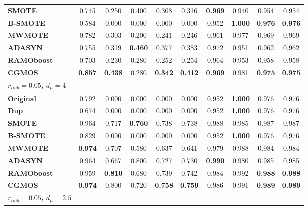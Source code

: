 \documentclass{iitthesis}
\begin{document}
\begin{table}[]
\begin{center}
{\begin{tabular}{lccccccccc}
\multicolumn{1}{l}{\textbf{SMOTE}} & 0.745 & 0.250 & 0.400 & 0.308 & 0.316 & \textbf{0.969} & 0.940 & 0.954 & 0.954 \\ 
\multicolumn{1}{l}{\textbf{B-SMOTE}} & 0.584 & 0.000 & 0.000 & 0.000 & 0.000 & 0.952 & \textbf{1.000} & \textbf{0.976} & \textbf{0.976} \\
\multicolumn{1}{l}{\textbf{MWMOTE}} & 0.782 & 0.303 & 0.200 & 0.241 & 0.246 & 0.961 & 0.977 & 0.969 & 0.969 \\ 
\multicolumn{1}{l}{\textbf{ADASYN}} & 0.755 & 0.319 & \textbf{0.460} & 0.377 & 0.383 & 0.972 & 0.951 & 0.962 & 0.962 \\
\multicolumn{1}{l}{\textbf{RAMOboost}} & 0.703 & 0.230 & 0.280 & 0.252 & 0.254 & 0.964 & 0.953 & 0.958 & 0.958 \\
\multicolumn{1}{l}{\textbf{CGMOS}} & \textbf{0.857} & \textbf{0.438} & 0.280 & \textbf{0.342} & \textbf{0.412} & \textbf{0.969} & 0.981 & \textbf{0.975} & \textbf{0.975} \\
\hline
\multicolumn{1}{l}{\textbf{$r_{imb}=0.05$, $d_{\mu}=4$}} &  & \multicolumn{4}{c}{} & \multicolumn{4}{c}{} \\
\hline
\multicolumn{1}{l}{\textbf{Original}} & 0.792 & 0.000 & 0.000 & 0.000 & 0.000 & 0.952 & \textbf{1.000} & 0.976 & 0.976 \\ 
\multicolumn{1}{l}{\textbf{Dup}} & 0.674 & 0.000 & 0.000 & 0.000 & 0.000 & 0.952 & \textbf{1.000} & 0.976 & 0.976 \\ 
\multicolumn{1}{l}{\textbf{SMOTE}} & 0.964 & 0.717 & \textbf{0.760} & 0.738 & 0.738 & 0.988 & 0.985 & 0.987 & 0.987 \\ 
\multicolumn{1}{l}{\textbf{B-SMOTE}} & 0.829 & 0.000 & 0.000 & 0.000 & 0.000 & 0.952 & \textbf{1.000} & 0.976 & 0.976 \\ 
\multicolumn{1}{l}{\textbf{MWMOTE}} & \textbf{0.974} & 0.707 & 0.580 & 0.637 & 0.641 & 0.979 & 0.988 & 0.984 & 0.984 \\ 
\multicolumn{1}{l}{\textbf{ADASYN}} & 0.964 & 0.667 & 0.800 & 0.727 & 0.730 & \textbf{0.990} & 0.980 & 0.985 & 0.985 \\ 
\multicolumn{1}{l}{\textbf{RAMOboost}} & 0.959 & \textbf{0.810} & 0.680 & 0.739 & 0.742 & 0.984 & 0.992 & \textbf{0.988} & \textbf{0.988} \\ 
\multicolumn{1}{l}{\textbf{CGMOS}} & \textbf{0.974} & 0.800 & 0.720 & \textbf{0.758} & \textbf{0.759} & 0.986 & 0.991 & \textbf{0.989} & \textbf{0.989} \\
\hline
\multicolumn{1}{l}{\textbf{$r_{imb}=0.05$, $d_{\mu}=2.5$}} &  & \multicolumn{4}{c}{} & \multicolumn{4}{c}{} \\

\end{tabular}}
\end{center}
\end{table}
\end{document}

